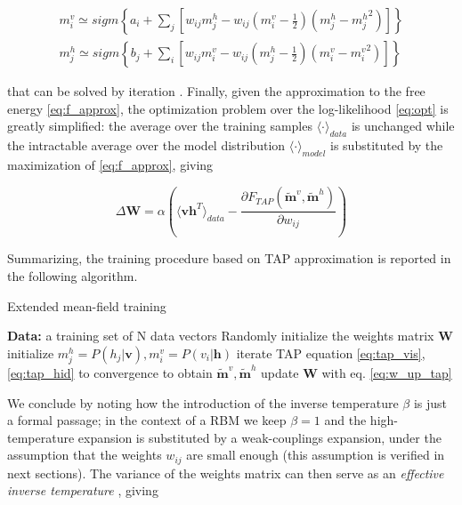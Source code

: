 \documentclass[notitlepage]{revtex4-1}
\begin{document}
\begin{align}
m_i^v \simeq sigm \left\{ a_i + \sum_j \left[ w_{ij} m_j^h - w_{ij} \left( m_i^v - \frac{1}{2} \right) \left( m_j^h - {m_j^h}^2 \right) \right] \right\} \label{eq:tap_vis} \\
m_j^h \simeq sigm \left\{ b_j + \sum_i \left[ w_{ij} m_i^v - w_{ij} \left( m_j^h - \frac{1}{2} \right) \left( m_i^v - {m_i^v}^2 \right) \right] \right\} \label{eq:tap_hid}
\end{align}

that can be solved by iteration \cite{conv}. Finally, given the approximation to the free energy \eqref{eq:f_approx}, the optimization problem over the log-likelihood \eqref{eq:opt} is greatly simplified: the average over the training samples \(\textstyle \langle \cdot \rangle_{data}\) is unchanged while the intractable average over the model distribution \(\textstyle \langle \cdot \rangle_{model}\) is substituted by the maximization of \eqref{eq:f_approx}, giving

\begin{equation}
\Delta \mathbf{W} = \alpha \left( \langle \mathbf{v h}^T \rangle_{data} - \frac{\partial F_{TAP}(\mathbf{\tilde{m}}^v, \mathbf{\tilde{m}}^h)}{\partial w_{ij}} \right)
\label{eq:w_up_tap}
\end{equation}

Summarizing, the training procedure based on TAP approximation is reported in the following algorithm.

\begin{algorithm}[H]
\caption{Extended mean-field training}\label{alg:tap}
\begin{algorithmic}[1]
\State \textbf{Data:} a training set of N data vectors
\State Randomly initialize the weights matrix \textbf{W}
    \State initialize  \(m_j^h=P(h_j|\mathbf{v}),m_i^v=P(v_i|\mathbf{h})\)
    \State iterate TAP equation \eqref{eq:tap_vis},\eqref{eq:tap_hid} to convergence to obtain \(\tilde{\mathbf{m}}^v,\tilde{\mathbf{m}}^h\)
    \State update \(\mathbf{W}\) with eq. \eqref{eq:w_up_tap}
  \EndFor
\EndFor
\end{algorithmic}
\end{algorithm}

We conclude by noting how the introduction of the inverse temperature \(\beta\) is just a formal passage; in the context of a RBM we keep \(\beta = 1\) and the high-temperature expansion is substituted by a weak-couplings expansion, under the assumption that the weights \(w_{ij}\) are small enough (this assumption is verified in next sections). The variance of the weights matrix can then serve as an \textit{effective inverse temperature} \cite{monasson}, giving
\end{document}
